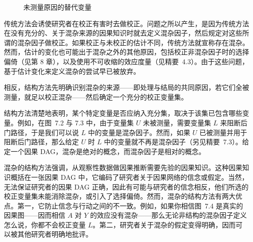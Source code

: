 \begin{figure}[htbp]
\centering
{}
\caption{未测量原因的替代变量}
\label{fig:7.8}
\end{figure}

传统方法会诱使研究者在校正有害时去做校正。问题之所以产生，是因为传统方法在没有充分的、关于混杂来源的因果知识时就去定义混杂因子，然后规定对这些所谓的混杂因子做校正。如果校正与未校正的估计不同，传统方法就宣称存在混杂。然而，估计的变化也可能出于混杂之外的其他原因，包括校正非混杂因子时的选择偏倚（见第 8 章），以及使用不可收缩的效应度量（见精要~4.3）。由于这些问题，基于估计变化来定义混杂的尝试早已被放弃。

相反，结构方法先明确识别混杂的来源——即处理与结局的共同原因，若它们全被测量，就足以校正混杂——然后确定一个充分的校正变量集。

结构方法清楚地表明，某个特定变量是否应纳入充分集，取决于该集已包含哪些变量。例如，在图~7.2 与 7.3 中，由于变量集 $U$ 未被测量，需要变量集 $L$ 来阻断后门路径，于是我们可以说 $L$ 中的变量是混杂因子。然而，如果 $U$ 已被测量并用于阻断后门路径，那么给定 $U$ 时 $L$ 中的变量就不再是混杂因子（另见精要~7.3）。给定一个因果 DAG，混杂是绝对的概念，而混杂因子是相对的概念。

混杂的结构方法强调，从观察性数据做因果推断需要先验的因果知识。这种因果知识概括在一张因果 DAG 中，它编码了研究者关于因果网络的信念或假定。当然，无法保证研究者的因果 DAG 正确，因此有可能与研究者的信念相反，他们所选的校正变量集未能消除混杂，或引入了选择偏倚。然而，混杂的结构方法有两大优点。第一，它防止信念与行动之间的不一致。例如，如果你相信图~7.4 是真实的因果图——因而相信 $A$ 对 $Y$ 的效应没有混杂——那么无论非结构的混杂因子定义怎么说，你都不会校正变量 $L$。第二，研究者关于混杂的假定变得明确，因而可以被其他研究者明确地批评。

